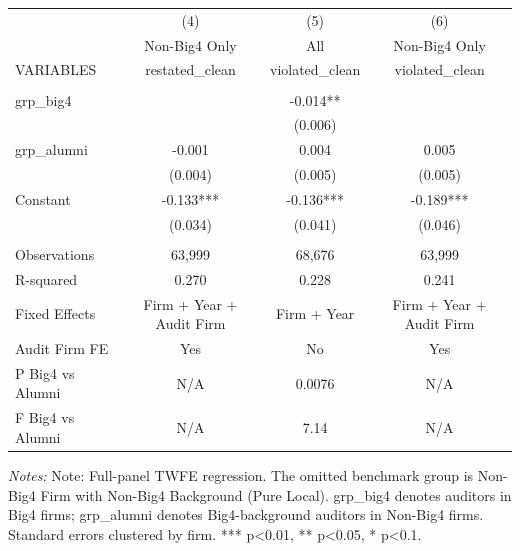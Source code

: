 \documentclass[10pt]{article}
\begin{document}
\begin{minipage}{20cm}\fontsize{10}{12}\selectfont\setlength{\tabcolsep}{4pt}\renewcommand{\arraystretch}{1.12}


\centering
{}
\begin{threeparttable}
\begin{tabular}{p{}ccc}
\toprule
 & (4) & (5) & (6) \\
 & Non-Big4 Only & All & Non-Big4 Only \\
VARIABLES & restated\_clean & violated\_clean & violated\_clean \\
\midrule
 &  &  &  \\
grp\_big4 &  & -0.014** &  \\
 &  & (0.006) &  \\
grp\_alumni & -0.001 & 0.004 & 0.005 \\
 & (0.004) & (0.005) & (0.005) \\
Constant & -0.133*** & -0.136*** & -0.189*** \\
 & (0.034) & (0.041) & (0.046) \\
 &  &  &  \\
Observations & 63,999 & 68,676 & 63,999 \\
R-squared & 0.270 & 0.228 & 0.241 \\
Fixed Effects & Firm + Year + Audit Firm & Firm + Year & Firm + Year + Audit Firm \\
Audit Firm FE & Yes & No & Yes \\
P Big4 vs Alumni & N/A & 0.0076 & N/A \\
F Big4 vs Alumni & N/A & 7.14 & N/A \\
\bottomrule
\end{tabular}
\begin{tablenotes}\fontsize{9}{11}\selectfont
\item \raggedright \fontsize{9}{11}\selectfont \textit{Notes:} Note: Full-panel TWFE regression. The omitted benchmark group is Non-Big4 Firm with Non-Big4 Background (Pure Local). grp\_big4 denotes auditors in Big4 firms; grp\_alumni denotes Big4-background auditors in Non-Big4 firms. Standard errors clustered by firm. *** p<0.01, ** p<0.05, * p<0.1.
\end{tablenotes}
\end{threeparttable}

\end{minipage}
\end{document}
